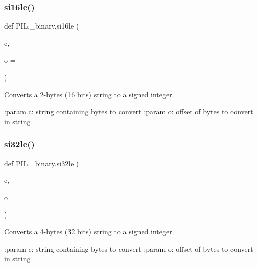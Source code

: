 \mbox{\label{namespacePIL_1_1__binary_a02031d4bc51e9acba575e5d9994281fc}} 
\subsubsection{\texorpdfstring{si16le()}{si16le()}}
{\footnotesize\ttfamily def P\+I\+L.\+\_\+binary.\+si16le (\begin{DoxyParamCaption}\item[{}]{c,  }\item[{}]{o = {} }\end{DoxyParamCaption})}

\begin{DoxyVerb}Converts a 2-bytes (16 bits) string to a signed integer.

:param c: string containing bytes to convert
:param o: offset of bytes to convert in string
\end{DoxyVerb}
 \mbox{\label{namespacePIL_1_1__binary_a7f52cbbccb4cbb0da5360ab124f6476e}} 
\subsubsection{\texorpdfstring{si32le()}{si32le()}}
{\footnotesize\ttfamily def P\+I\+L.\+\_\+binary.\+si32le (\begin{DoxyParamCaption}\item[{}]{c,  }\item[{}]{o = {} }\end{DoxyParamCaption})}

\begin{DoxyVerb}Converts a 4-bytes (32 bits) string to a signed integer.

:param c: string containing bytes to convert
:param o: offset of bytes to convert in string
\end{DoxyVerb}
 